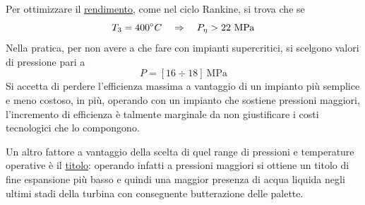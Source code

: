 \begin{adjustwidth}{2in}{}
	Per ottimizzare il \underline{rendimento}, come nel ciclo Rankine, si trova che se 
	\[T_3 = 400 \degree C \quad \Rightarrow \quad P_{\eta}>22~\text{MPa}\]
	Nella pratica, per non avere a che fare con impianti supercritici, si scelgono valori di pressione pari a
	\[P = [16\div18]~\text{MPa}\]
	Si accetta di perdere l'efficienza massima a vantaggio di un impianto più semplice e meno costoso, in più, operando con un impianto che sostiene pressioni maggiori, l'incremento di efficienza è talmente marginale da non giustificare i costi tecnologici che lo compongono.\newline 
	
	Un altro fattore a vantaggio della scelta di quel range di pressioni e temperature operative è il \underline{titolo}: operando infatti a pressioni maggiori si ottiene un titolo di fine espansione più basso e quindi una maggior presenza di acqua liquida negli ultimi stadi della turbina con conseguente butterazione delle palette.
\end{adjustwidth}



